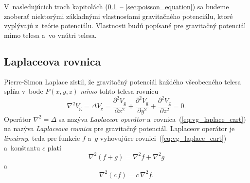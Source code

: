 \documentclass[a4paper,12pt]{book}
\newcommand{\gidx}{\mathrm g}
\begin{document}
V~nasledujúcich troch kapitolách (\ref{sec:laplace_equation}~--
\ref{sec:poisson_equation}) sa budeme zaoberať niektorými základnými
vlastnosťami gravitačného potenciálu, ktoré vyplývajú z~teórie potenciálu.
Vlastnosti budú popísané pre gravitačný potenciál mimo telesa a~vo vnútri
telesa.





\subsection{Laplaceova rovnica}
\label{sec:laplace_equation}

Pierre-Simon Laplace zistil, že gravitačný potenciál každého všeobecného telesa
spĺňa v~bode $P(x, y, z)$ \emph{mimo} tohto telesa rovnicu
%
\begin{equation}
\label{eq:vg_laplace_cart}
\nabla^2 V_\gidx = \Delta V_\gidx = \frac{\partial^2 V_\gidx}{\partial x^2}
+ \frac{\partial^2 V_\gidx}{\partial y^2} + \frac{\partial^2 V_\gidx}{\partial
z^2} = 0{.}
\end{equation}
%
Operátor $\nabla^2 = \Delta$ sa nazýva \emph{Laplaceov operátor}
a~rovnica~(\ref{eq:vg_laplace_cart}) na nazýva \emph{Laplaceova rovnica} pre
gravitačný potenciál.  Laplaceov operátor je \emph{lineárny}, teda pre funkcie
$f$ a~$g$ vyhovujúce rovnici~(\ref{eq:vg_laplace_cart}) a~konštantu $c$ platí
%
\begin{equation}
\label{eq:laplace_additivity}
\nabla^2 \left(f + g \right) = \nabla^2 f + \nabla^2 g
\end{equation}
%
a
%
\begin{equation}
\label{eq:laplace_homogenity}
\nabla^2 (c \, f) = c \, \nabla^2 f{.}
\end{equation}
\end{document}
